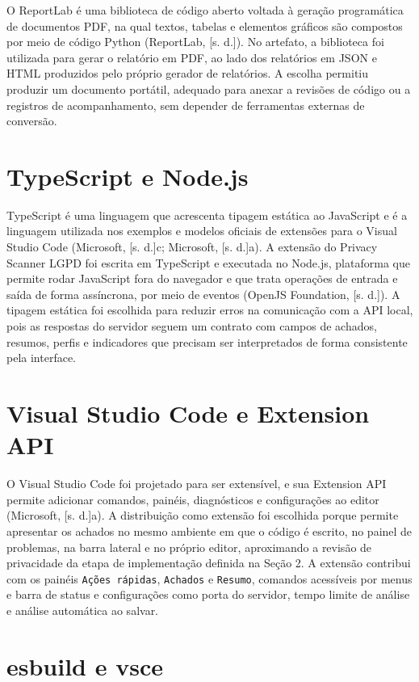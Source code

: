 \documentclass[12pt,a4paper,oneside]{report}
\begin{document}
O ReportLab é uma biblioteca de código aberto voltada à geração programática de documentos PDF, na qual textos, tabelas e elementos gráficos são compostos por meio de código Python (ReportLab, [s. d.]). No artefato, a biblioteca foi utilizada para gerar o relatório em PDF, ao lado dos relatórios em JSON e HTML produzidos pelo próprio gerador de relatórios. A escolha permitiu produzir um documento portátil, adequado para anexar a revisões de código ou a registros de acompanhamento, sem depender de ferramentas externas de conversão.

\section{TypeScript e Node.js}

TypeScript é uma linguagem que acrescenta tipagem estática ao JavaScript e é a linguagem utilizada nos exemplos e modelos oficiais de extensões para o Visual Studio Code (Microsoft, [s. d.]c; Microsoft, [s. d.]a). A extensão do Privacy Scanner LGPD foi escrita em TypeScript e executada no Node.js, plataforma que permite rodar JavaScript fora do navegador e que trata operações de entrada e saída de forma assíncrona, por meio de eventos (OpenJS Foundation, [s. d.]). A tipagem estática foi escolhida para reduzir erros na comunicação com a API local, pois as respostas do servidor seguem um contrato com campos de achados, resumos, perfis e indicadores que precisam ser interpretados de forma consistente pela interface.

\section{Visual Studio Code e Extension API}

O Visual Studio Code foi projetado para ser extensível, e sua Extension API permite adicionar comandos, painéis, diagnósticos e configurações ao editor (Microsoft, [s. d.]a). A distribuição como extensão foi escolhida porque permite apresentar os achados no mesmo ambiente em que o código é escrito, no painel de problemas, na barra lateral e no próprio editor, aproximando a revisão de privacidade da etapa de implementação definida na Seção 2. A extensão contribui com os painéis \texttt{Ações rápidas}, \texttt{Achados} e \texttt{Resumo}, comandos acessíveis por menus e barra de status e configurações como porta do servidor, tempo limite de análise e análise automática ao salvar.

\section{esbuild e vsce}
\end{document}
